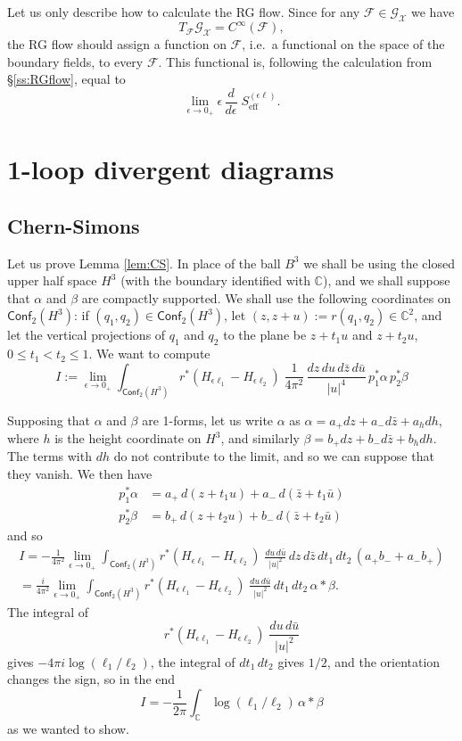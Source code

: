 \documentclass[a4paper]{amsart}
\theoremstyle{plain}
\theoremstyle{definition}
\newcommand{\mc}{\mathcal}
\newcommand{\C}{\mathbb{C}}
\newcommand{\cf}{\mathsf{Conf}}
\begin{document}
Let us only describe how to calculate the RG flow.
Since for any $\mc F\in\mc{G}_\mc X$ we have
$$T_\mc F \mc{G}_\mc X =C^\infty(\mc F), $$
the RG flow should assign a function on $\mc F$, i.e.\ a functional on the space of the boundary fields, to every $\mc F$. This functional is, following the calculation from \S\ref{ss:RGflow}, equal to
\begin{equation}\label{akszrg}
\lim_{\epsilon\to0_+} \epsilon\,\frac d{d\epsilon}\; S_\text{eff}^{(\epsilon\ell)}.
\end{equation}



\appendix

\section{1-loop divergent diagrams}
\subsection{Chern-Simons}
Let us prove Lemma \ref{lem:CS}. In place of the ball $B^3$ we shall be using the closed upper half space $H^3$ (with the boundary identified with $\C$), and we shall suppose that $\alpha$ and $\beta$ are compactly supported. We shall use the following coordinates on $\cf_2(H^3)$: if $(q_1,q_2)\in\cf_2(H^3)$, let $(z,z+u):=r(q_1,q_2)\in\C^2$, and let the vertical projections of $q_1$ and $q_2$ to the plane be $z+t_1u$ and $z+t_2u$, $0\leq t_1<t_2\leq1$. We want to compute
$$I:=
\lim_{\epsilon\to0_+}\int_{\cf_2(H^3)}r^*(H_{\epsilon\ell_1}-H_{\epsilon\ell_2})\;\frac1{4\pi^2}\,\frac{dz\,du\,d\bar z\,d\bar u}{|u|^4}\,p_1^*\alpha\, p_2^*\beta
$$

Supposing that $\alpha$ and $\beta$ are 1-forms, let us write $\alpha$ as $\alpha=a_+dz + a_-d\bar z + a_h dh$, where $h$ is the height coordinate on $H^3$, and similarly 
$\beta=b_+dz + b_-d\bar z + b_h dh$. The terms with $dh$ do not contribute to the limit, and so we can suppose that they vanish. We then have
\begin{align*}
p_1^*\alpha&=a_+\, d(z+t_1 u) + a_-\, d(\bar z + t_1\bar u)\\
p_2^*\beta&=b_+\, d(z+t_2 u) + b_-\, d(\bar z + t_2\bar u)
\end{align*}
and so
\begin{multline*}
I=-\frac1{4\pi^2}\lim_{\epsilon\to0_+}\int_{\cf_2(H^3)}r^*(H_{\epsilon\ell_1}-H_{\epsilon\ell_2})\;\frac{du\,d\bar u}{|u|^2}\,dz\,d\bar z\,dt_1\,dt_2\,(a_+b_-+a_-b_+) \\
=\frac i{4\pi^2}\lim_{\epsilon\to0_+}\int_{\cf_2(H^3)}r^*(H_{\epsilon\ell_1}-H_{\epsilon\ell_2})\;\frac{du\,d\bar u}{|u|^2}\,dt_1\,dt_2\,\alpha *\beta.
\end{multline*}
The integral of 
$$r^*(H_{\epsilon\ell_1}-H_{\epsilon\ell_2})\;\frac{du\,d\bar u}{|u|^2}$$
gives $-4\pi i\log(\ell_1/\ell_2)$, the integral of $dt_1\,dt_2$ gives $1/2$, and the orientation changes the sign, so in the end
$$I=-\frac1{2\pi}\int_\C\log(\ell_1/\ell_2)\,\alpha*\beta$$
as we wanted to show.
\end{document}
